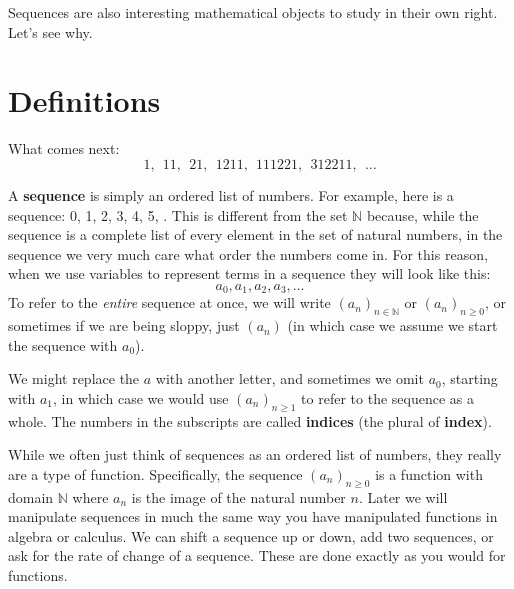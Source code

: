 \documentclass[11pt,]{book}
\newcommand{\terminology}[1]{\textbf{#1}}
\theoremstyle{ptxplainnotitle}
\theoremstyle{ptxplaintitle}
\theoremstyle{ptxdefinitionnotitle}
\theoremstyle{ptxdefinitiontitle}
\theoremstyle{ptxdefinitionnotitle}
\theoremstyle{ptxdefinitiontitle}
\theoremstyle{ptxdefinitionnotitle}
\theoremstyle{ptxdefinitiontitle}
\theoremstyle{ptxdefinitiontitlenonumber}
\theoremstyle{ptxdefinitiontitlenonumber}
\numberwithin{equation}{chapter}
\newcommand{\N}{\mathbb N}
\begin{document}
\par
\hypertarget{p-22}{}%
Sequences are also interesting mathematical objects to study in their own right. Let's see why.%
\typeout{************************************************}
\typeout{************************************************}
\section[{Definitions}]{Definitions}\label{sec_seq_intro}
\begin{investigation}\label{investigation-2}
\hypertarget{p-23}{}%
What comes next:%
\begin{equation*}
1, ~~11, ~~21, ~~1211, ~~111221, ~~312211, ~~\ldots
\end{equation*}
%
\end{investigation}
\hypertarget{p-24}{}%
A \terminology{sequence} is simply an ordered list of numbers. For example, here is a sequence: 0, 1, 2, 3, 4, 5, \textellipsis{}. This is different from the set \(\N\) because, while the sequence is a complete list of every element in the set of natural numbers, in the sequence we very much care what order the numbers come in. For this reason, when we use variables to represent terms in a sequence they will look like this:%
\begin{equation*}
a_0, a_1, a_2, a_3, \ldots
\end{equation*}
To refer to the \emph{entire} sequence at once, we will write \((a_n)_{n\in\N}\) or \((a_n)_{n\ge 0}\), or sometimes if we are being sloppy, just \((a_n)\) (in which case we assume we start the sequence with \(a_0\)). \label{notation-1}
%
\par
\hypertarget{p-25}{}%
We might replace the \(a\) with another letter, and sometimes we omit \(a_0\), starting with \(a_1\), in which case we would use \((a_n)_{n \ge 1}\) to refer to the sequence as a whole. The numbers in the subscripts are called \terminology{indices} (the plural of \terminology{index}).%
\par
\hypertarget{p-26}{}%
While we often just think of sequences as an ordered list of numbers, they really are a type of function. Specifically, the sequence \((a_n)_{n\ge 0}\) is a function with domain \(\N\) where \(a_n\) is the image of the natural number \(n\). Later we will manipulate sequences in much the same way you have manipulated functions in algebra or calculus. We can shift a sequence up or down, add two sequences, or ask for the rate of change of a sequence. These are done exactly as you would for functions.%
\end{document}
